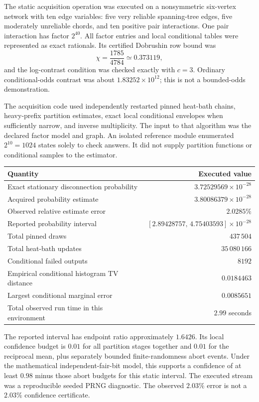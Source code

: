 The static acquisition operation was executed on a nonsymmetric six-vertex network with ten edge variables: five very reliable spanning-tree edges, five moderately unreliable chords, and ten positive pair interactions. One pair interaction has factor $2^{40}$. All factor entries and local conditional tables were represented as exact rationals. Its certified Dobrushin row bound was
\[
 \chi=\frac{1785}{4784}\simeq0.373119,
\]
and the log-contrast condition was checked exactly with $c=3$. Ordinary conditional-odds contrast was about $1.83252\times10^{12}$; this is not a bounded-odds demonstration.

The acquisition code used independently restarted pinned heat-bath chains, heavy-prefix partition estimates, exact local conditional envelopes when sufficiently narrow, and inverse multiplicity. The input to that algorithm was the declared factor model and graph. An isolated reference module enumerated $2^{10}=1024$ states solely to check answers. It did not supply partition functions or conditional samples to the estimator.

\begin{center}
\begin{tabular}{lr}
\toprule
Quantity & Executed value\\\midrule
Exact stationary disconnection probability & $3.72529569\times10^{-28}$\\
Acquired probability estimate & $3.80086379\times10^{-28}$\\
Observed relative estimate error & $2.0285\%$\\
Reported probability interval & $[2.89428757,\,4.75403593]\times10^{-28}$\\
Total pinned draws & $437\,504$\\
Total heat-bath updates & $35\,080\,166$\\
Conditional failed outputs & $8192$\\
Empirical conditional histogram TV distance & $0.0184463$\\
Largest conditional marginal error & $0.0085651$\\
Total observed run time in this environment & $2.99$ seconds\\\bottomrule
\end{tabular}
\end{center}

The reported interval has endpoint ratio approximately $1.6426$. Its local confidence budget is $0.01$ for all partition stages together and $0.01$ for the reciprocal mean, plus separately bounded finite-randomness abort events. Under the mathematical independent-fair-bit model, this supports a confidence of at least $0.98$ minus those abort budgets for this static interval. The executed stream was a reproducible seeded PRNG diagnostic. The observed $2.03\%$ error is not a $2.03\%$ confidence certificate.

